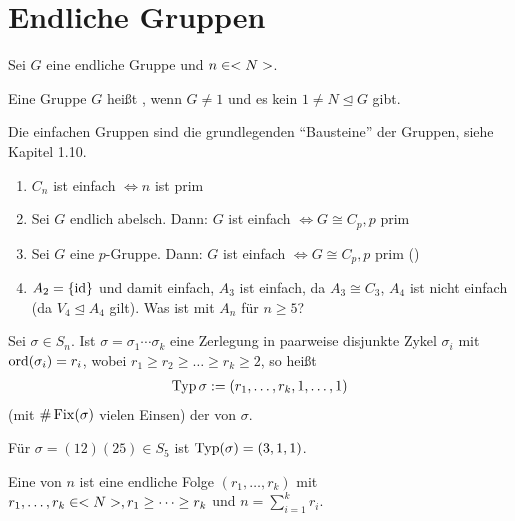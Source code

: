 \section{Endliche Gruppen}

Sei $G$ eine endliche Gruppe und $n \in <N>$.

\begin{definition}
	Eine Gruppe $G$ heißt , wenn $G \neq 1$ und es kein $1 \neq N \unlhd G$ gibt. %
\end{definition}

\begin{remark}
	Die einfachen Gruppen sind die grundlegenden ``Bausteine'' der Gruppen, siehe Kapitel 1.10.
\end{remark}

\begin{example}
	\begin{enumerate}
		\item $C_n$ ist einfach $\Leftrightarrow n$ ist prim
		\item Sei $G$ endlich abelsch. Dann: $G$ ist einfach $\Leftrightarrow G \cong C_p, p$ prim
		\item Sei $G$ eine $p$-Gruppe. Dann: $G$ ist einfach $\Leftrightarrow G \cong C_p, p$ prim ()
		\item $A_2 = \{\operatorname{id}\}$ und damit einfach, $A_3$ ist einfach, da $A_3 \cong C_3$, $A_4$ ist nicht einfach (da $V_4 \unlhd A_4$ gilt). Was ist mit $A_n$ für $n \geq 5$?
	\end{enumerate}
\end{example}

\begin{definition}[Typ]
	Sei $\sigma \in S_n$. Ist $\sigma = \sigma_1\cdots \sigma_k$ eine Zerlegung in paarweise disjunkte Zykel $\sigma_i$ mit $\operatorname{ord}(\sigma_i)=r_i$, wobei $r_1 \geq r_2 \geq \dots \geq r_k \geq 2$, so heißt
	\begin{align}
	\operatorname{Typ}{\sigma} := (r_1,\dots,r_k,1,\dots,1)\notag
	\end{align}
	(mit $\#\operatorname{Fix}(\sigma)$ vielen Einsen) der  von $\sigma$.
\end{definition}

\begin{example}
	Für $\sigma = (12)(25) \in S_5$ ist $\operatorname{Typ}(\sigma) = (3,1,1)$.
\end{example}

\begin{definition}[Partition]
	Eine  von $n$ ist eine endliche Folge $(r_1,\dots,r_k)$ mit $r_1,\dots,r_k \in <N>,r_1\geq\dots\geq r_k$ und $n = \sum_{i=1}^{k} r_i$.
\end{definition}

